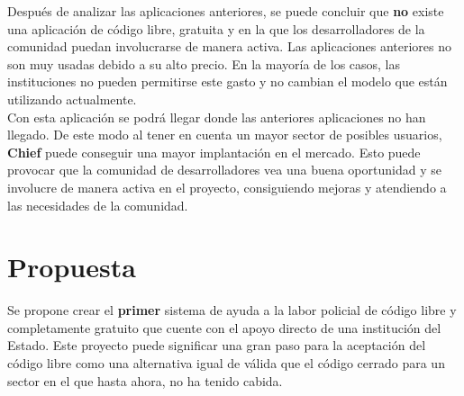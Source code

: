Después de analizar las aplicaciones anteriores, se puede concluir que \textbf{no} existe una aplicación
de código libre, gratuita y en la que los desarrolladores de la comunidad puedan involucrarse de manera activa.
Las aplicaciones anteriores no son muy usadas debido a su alto precio. En la mayoría de los casos, las instituciones
no pueden permitirse este gasto y no cambian el modelo que están utilizando actualmente.\\


Con esta aplicación se podrá llegar donde las anteriores aplicaciones no han llegado. De este modo al tener en cuenta un mayor sector de posibles usuarios, 
\textbf{Chief} puede conseguir una mayor implantación en el mercado. Esto puede provocar que la comunidad de desarrolladores vea una buena oportunidad y se involucre 
de manera activa en el proyecto, consiguiendo mejoras y atendiendo a las necesidades de la comunidad.

\section{Propuesta}

Se propone crear el \textbf{primer} sistema de ayuda a la labor policial de código libre y completamente gratuito que cuente
con el apoyo directo de una institución del Estado. Este proyecto puede significar una gran paso para la aceptación 
del código libre como una alternativa igual de válida que el código cerrado para un sector en el 
que hasta ahora, no ha tenido cabida.\\  
